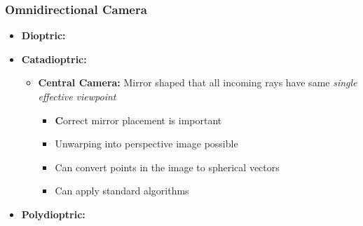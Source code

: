 \documentclass[a4paper]{article}
\newcommand{\ipro}{\item[+]}
\newcommand{\ides}[1]{\item \textbf{#1}}
\begin{document}
\subsubsection{Omnidirectional Camera}
\begin{itemize}
    \ides{Dioptric:}
    \ides{Catadioptric:}
        \begin{itemize}
            \ides{Central Camera:} Mirror shaped that all incoming rays have same \textit{single effective viewpoint}
                \begin{itemize}
                    \ides Correct mirror placement is important
                    \ipro Unwarping into perspective image possible
                    \ipro Can convert points in the image to spherical vectors
                    \ipro Can apply standard algorithms
                \end{itemize}
        \end{itemize}
    \ides{Polydioptric:}
\end{itemize}
\end{document}
